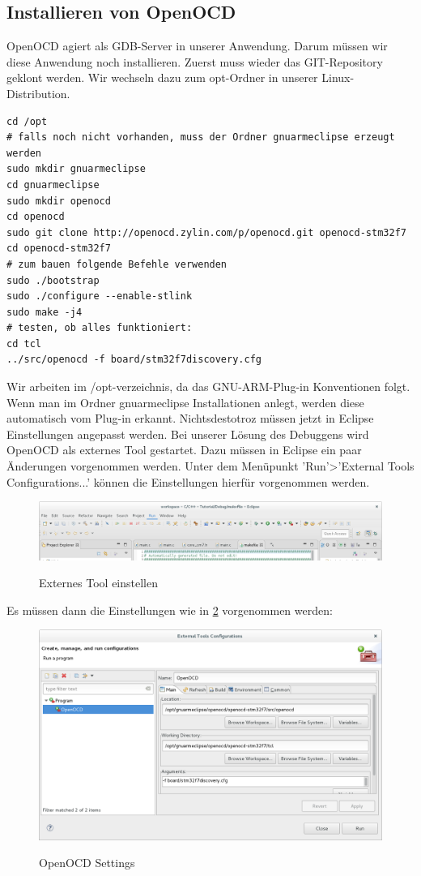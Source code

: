 \subsection{Installieren von OpenOCD}
OpenOCD agiert als GDB-Server in unserer Anwendung. Darum müssen wir diese Anwendung noch installieren.
Zuerst muss wieder das GIT-Repository geklont werden. Wir wechseln dazu zum opt-Ordner in unserer Linux-Distribution.
\begin{lstlisting}
cd /opt
# falls noch nicht vorhanden, muss der Ordner gnuarmeclipse erzeugt werden
sudo mkdir gnuarmeclipse
cd gnuarmeclipse
sudo mkdir openocd
cd openocd
sudo git clone http://openocd.zylin.com/p/openocd.git openocd-stm32f7
cd openocd-stm32f7
# zum bauen folgende Befehle verwenden
sudo ./bootstrap
sudo ./configure --enable-stlink
sudo make -j4
# testen, ob alles funktioniert:
cd tcl
../src/openocd -f board/stm32f7discovery.cfg
\end{lstlisting}
Wir arbeiten im /opt-verzeichnis, da das GNU-ARM-Plug-in Konventionen folgt. Wenn man im Ordner gnuarmeclipse Installationen anlegt, werden diese automatisch vom Plug-in erkannt.
Nichtsdestotroz müssen jetzt in Eclipse Einstellungen angepasst werden.
Bei unserer Lösung des Debuggens wird OpenOCD als externes Tool gestartet. Dazu müssen in Eclipse ein paar Änderungen vorgenommen werden. Unter dem Menüpunkt 'Run'>'External Tools Configurations...' können die Einstellungen hierfür vorgenommen werden.
\begin{figure}[h]
\begin{center}
\includegraphics[width=12cm]{grafiken/debugger/RunConfiguration1.png}
\label{eclipse_external_tool_setup}
\caption{Externes Tool einstellen}
\end{center}
\end{figure}
Es müssen dann die Einstellungen wie in \ref{ecplipse_OpenOCD_setting1} vorgenommen werden: 
\begin{figure}[h]
\begin{center}
\includegraphics[width=12cm]{grafiken/debugger/OpenOCDsetting.png}
\label{ecplipse_OpenOCD_setting1}
\caption{OpenOCD Settings}
\end{center}
\end{figure}
\newpage
